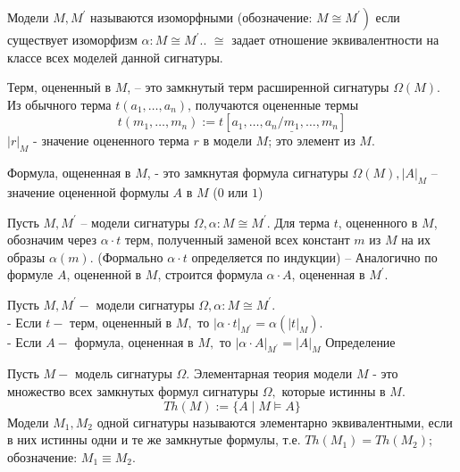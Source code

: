 \begin{defn}
Модели $M, M^{\prime}$ называются изоморфными (обозначение: $\left.M \cong M^{\prime}\right)$ если существует изоморфизм $\alpha: M \cong M^{\prime}$.. $\cong$ задает отношение эквивалентности на классе всех моделей данной сигнатуры.
\end{defn}

\begin{defn}
Терм, оцененный в $M$, -- это замкнутый терм расширенной сигнатуры $\Omega(M)$. Из обычного терма $t\left(a_{1}, \ldots, a_{n}\right)$, получаются оцененные термы
$$
t\left(m_{1}, \ldots, m_{n}\right):=t\left[a_{1}, \ldots, a_{n} / \underline{m_{1}}, \ldots, m_{n}\right]
$$
$|r|_{M}$ - значение оцененного терма $r$ в модели $M$; это элемент из $M$.
\end{defn}
\begin{defn}
Формула, ощененная в $M$, - это замкнутая формула сигнатуры $\Omega(M),|A|_{M}$ -- значение оцененной формулы $A$ в $M$ ($0$ или $1$)
\end{defn}


Пусть $M, M^{\prime}$ -- модели сигнатуры $\Omega, \alpha: M \cong M^{\prime}$. Для терма $t$, оцененного в $M$, обозначим через $\alpha \cdot t$ терм, полученный заменой всех констант $m$ из $M$ на их образы $\alpha(m)$. (Формально $\alpha \cdot t$ определяется по индукции)
-- Аналогично по формуле $A$, оцененной в $M$, строится формула $\alpha \cdot A$, оцененная в $M^{\prime}$.

\begin{theo}
Пусть $M, M^{\prime}-$ модели сигнатуры $\Omega, \alpha: M \cong M^{\prime} .$\\
- Если $t-$ терм, оцененный в $M,$ то $|\alpha \cdot t|_{M^{\prime}}=\alpha\left(|t|_{M}\right) .$\\
- Если $A-$ формула, оцененная в $M,$ то $|\alpha \cdot A|_{M^{\prime}}=|A|_{M}$ Определение

Пусть $M-$ модель сигнатуры $\Omega .$ Элементарная теория модели $M$ - это множество всех замкнутых формул сигнатуры $\Omega,$ которые истинны в $M .$
$$
T h(M):=\{A \mid M \models A\}
$$
Модели $M_{1}, M_{2}$ одной сигнатуры называются элементарно
эквивалентными, если в них истинны одни и те же замкнутые формулы, т.е. $T h\left(M_{1}\right)=T h\left(M_{2}\right) ;$ обозначение: $M_{1} \equiv M_{2} .$
\end{theo}

